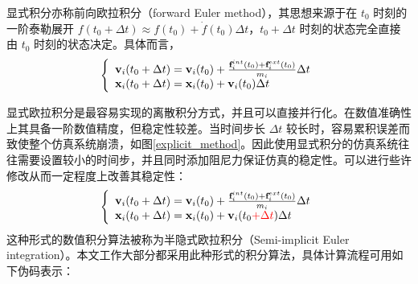 显式积分亦称前向欧拉积分（forward Euler method），其思想来源于在 $t_0$ 时刻的一阶泰勒展开 $f(t_0 + \Delta t) \approx f(t_0) + \dot{f}(t_0)\Delta t$，$t_0 + \Delta t$ 时刻的状态完全直接由 $t_0$ 时刻的状态决定。具体而言，
\begin{equation}
\left\{ \begin{array}{l}
\textbf{v}_i(t_0+\Delta t) = \textbf{v}_i(t_0)+\frac{\textbf{f}_i^{int}(t_0) + \textbf{f}_i^{ext}(t_0)}{m_i}\Delta t\\
\textbf{x}_i(t_0+\Delta t) = \textbf{x}_i(t_0)+\textbf{v}_i(t_0)\Delta t
\end{array} \right.
\end{equation}

显式欧拉积分是最容易实现的离散积分方式，并且可以直接并行化。在数值准确性上其具备一阶数值精度，但稳定性较差。当时间步长 $\Delta t$ 较长时，容易累积误差而致使整个仿真系统崩溃，如图\ref{explicit_method}。因此使用显式积分的仿真系统往往需要设置较小的时间步，并且同时添加阻尼力保证仿真的稳定性。可以进行些许修改从而一定程度上改善其稳定性：
\begin{equation}
\left\{ \begin{array}{l}
\textbf{v}_i(t_0+\Delta t) = \textbf{v}_i(t_0)+\frac{\textbf{f}_i^{int}(t_0) + \textbf{f}_i^{ext}(t_0)}{m_i}\Delta t\\
\textbf{x}_i(t_0+\Delta t) = \textbf{x}_i(t_0)+\textbf{v}_i(t_0 \textcolor{red}{ + \Delta t})\Delta t
\end{array} \right.
\end{equation}
这种形式的数值积分算法被称为半隐式欧拉积分（Semi-implicit Euler integration）。本文工作大部分都采用此种形式的积分算法，具体计算流程可用如下伪码表示：\\

\noindent{}\\

